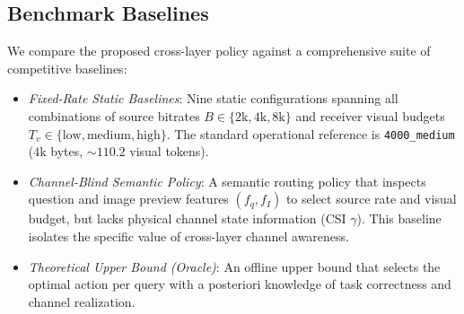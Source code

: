 \subsection{Benchmark Baselines}
We compare the proposed cross-layer policy against a comprehensive suite of competitive baselines:
\begin{itemize}
    \item \textit{Fixed-Rate Static Baselines}: Nine static configurations spanning all combinations of source bitrates $B \in \{2\text{k}, 4\text{k}, 8\text{k}\}$ and receiver visual budgets $T_v \in \{\mathrm{low}, \mathrm{medium}, \mathrm{high}\}$. The standard operational reference is \texttt{4000\_medium} ($4\text{k}$ bytes, $\sim 110.2$ visual tokens).
    \item \textit{Channel-Blind Semantic Policy}: A semantic routing policy that inspects question and image preview features $(f_q, f_I)$ to select source rate and visual budget, but lacks physical channel state information (CSI $\gamma$). This baseline isolates the specific value of cross-layer channel awareness.
    \item \textit{Theoretical Upper Bound (Oracle)}: An offline upper bound that selects the optimal action per query with a posteriori knowledge of task correctness and channel realization.
\end{itemize}

